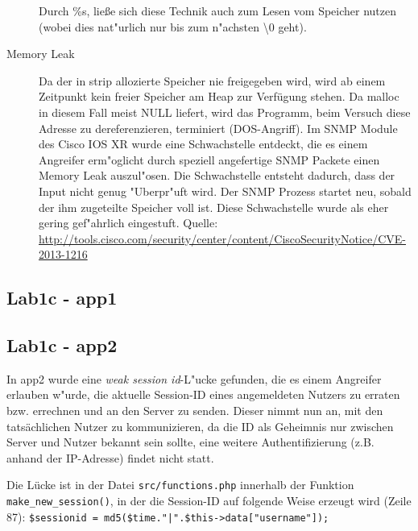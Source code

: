 \documentclass[12pt,a4paper,titlepage,oneside]{scrartcl}
\begin{document}
\begin{description}
    Durch \%s, ließe sich diese Technik auch zum Lesen vom Speicher nutzen (wobei dies nat"urlich nur bis zum n"achsten \textbackslash0 geht).\newline

    \item[Memory Leak]
    Da der in strip allozierte Speicher nie freigegeben wird, wird ab einem Zeitpunkt kein freier Speicher am Heap zur Verfügung stehen. Da malloc in diesem Fall meist NULL liefert, wird das Programm, beim Versuch diese Adresse zu dereferenzieren, terminiert (DOS-Angriff).\newline
    Im SNMP Module des Cisco IOS XR wurde eine Schwachstelle entdeckt, die es einem Angreifer erm"oglicht durch speziell angefertige SNMP Packete einen Memory Leak auszul"osen. Die Schwachstelle entsteht dadurch, dass der Input nicht genug "Uberpr"uft wird. Der SNMP Prozess startet neu, sobald der ihm zugeteilte Speicher voll ist. Diese Schwachstelle wurde als eher gering gef"ahrlich eingestuft.\newline
    Quelle: \url{http://tools.cisco.com/security/center/content/CiscoSecurityNotice/CVE-2013-1216}
\end{description}

\subsection{Lab1c - app1}

\subsection{Lab1c - app2}

In app2 wurde eine \textit{weak session id}-L"ucke gefunden, die es einem Angreifer erlauben w"urde, die aktuelle Session-ID eines angemeldeten Nutzers zu erraten bzw. errechnen und an den Server zu senden. Dieser nimmt nun an, mit den tatsächlichen Nutzer zu kommunizieren, da die ID als Geheimnis nur zwischen Server und Nutzer bekannt sein sollte, eine weitere Authentifizierung (z.B. anhand der IP-Adresse) findet nicht statt.

Die Lücke ist in der Datei \texttt{src/functions.php} innerhalb der Funktion \texttt{make\_new\_session()}, in der die Session-ID auf folgende Weise erzeugt wird (Zeile 87): \lstinline{$sessionid = md5($time."|".$this->data["username"]);}
\end{document}

